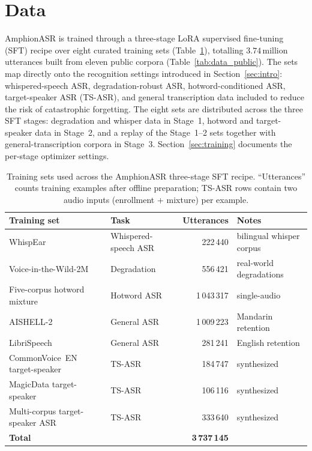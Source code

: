 \section{Data}
\label{sec:data}

AmphionASR is trained through a
three-stage LoRA supervised fine-tuning (SFT) recipe
over eight curated training sets
(Table~\ref{tab:training_sets}), totalling $3.74$\,million utterances
built from eleven public corpora (Table~\ref{tab:data_public}).
The sets map directly onto the recognition settings introduced in
Section~\ref{sec:intro}: whispered-speech ASR, degradation-robust
ASR, hotword-conditioned ASR, target-speaker ASR (TS-ASR), and
general transcription data included to reduce the risk of catastrophic
forgetting.
The eight sets are distributed across the three SFT stages:
degradation and whisper data in Stage~1, hotword and target-speaker
data in Stage~2, and a replay of the Stage~1--2 sets together with
general-transcription corpora in Stage~3. Section~\ref{sec:training}
documents the per-stage optimizer settings.

\begin{table}[t]
  \caption{Training sets used across the AmphionASR three-stage
    SFT recipe.
    ``Utterances'' counts training examples after offline preparation;
    TS-ASR rows contain two audio inputs (enrollment + mixture) per
    example.}
  \label{tab:training_sets}
  \centering
  \small
  \setlength{\tabcolsep}{3pt}
  \begin{tabular}{p{4.8cm}lrp{3.2cm}}
    \toprule
    Training set & Task & Utterances & Notes \\
    \midrule
    WhispEar \cite{fang2025whisperear}
      & Whispered-speech ASR & 222\,440  & bilingual whisper corpus \\
    Voice-in-the-Wild-2M \cite{xie2026mega}
      & Degradation     & 556\,421  & real-world degradations \\
    Five-corpus hotword mixture
      & Hotword ASR     & 1\,043\,317 & single-audio \\
    AISHELL-2 \cite{du2018aishell2}
      & General ASR      & 1\,009\,223 & Mandarin retention \\
    LibriSpeech \cite{panayotov2015librispeech}
      & General ASR      & 281\,241  & English retention \\
    CommonVoice~EN target-speaker
      & TS-ASR          & 184\,747  & synthesized \\
    MagicData target-speaker
      & TS-ASR          & 106\,116  & synthesized \\
    Multi-corpus target-speaker ASR
      & TS-ASR          & 333\,640  & synthesized \\
    \midrule
    \textbf{Total}            &                 & \textbf{3\,737\,145} & \\
    \bottomrule
  \end{tabular}
\end{table}


